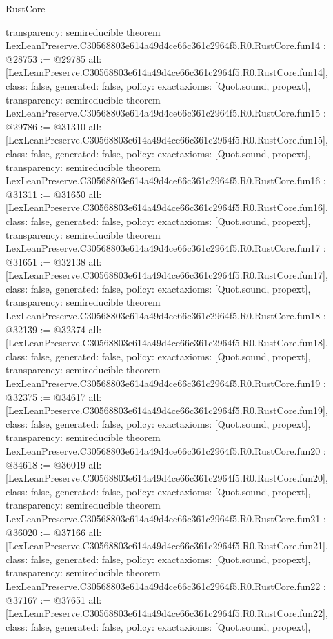 \begin{lexlean}{RustCore}
\begin{coremodule}
{  transparency: semireducible
}
theorem LexLeanPreserve.C30568803e614a49d4ce66c361c2964f5.R0.RustCore.fun14 : @28753 := @29785 {
  all: [LexLeanPreserve.C30568803e614a49d4ce66c361c2964f5.R0.RustCore.fun14],
  class: false,
  generated: false,
  policy: exact{axioms: [Quot.sound, propext]},
  transparency: semireducible
}
theorem LexLeanPreserve.C30568803e614a49d4ce66c361c2964f5.R0.RustCore.fun15 : @29786 := @31310 {
  all: [LexLeanPreserve.C30568803e614a49d4ce66c361c2964f5.R0.RustCore.fun15],
  class: false,
  generated: false,
  policy: exact{axioms: [Quot.sound, propext]},
  transparency: semireducible
}
theorem LexLeanPreserve.C30568803e614a49d4ce66c361c2964f5.R0.RustCore.fun16 : @31311 := @31650 {
  all: [LexLeanPreserve.C30568803e614a49d4ce66c361c2964f5.R0.RustCore.fun16],
  class: false,
  generated: false,
  policy: exact{axioms: [Quot.sound, propext]},
  transparency: semireducible
}
theorem LexLeanPreserve.C30568803e614a49d4ce66c361c2964f5.R0.RustCore.fun17 : @31651 := @32138 {
  all: [LexLeanPreserve.C30568803e614a49d4ce66c361c2964f5.R0.RustCore.fun17],
  class: false,
  generated: false,
  policy: exact{axioms: [Quot.sound, propext]},
  transparency: semireducible
}
theorem LexLeanPreserve.C30568803e614a49d4ce66c361c2964f5.R0.RustCore.fun18 : @32139 := @32374 {
  all: [LexLeanPreserve.C30568803e614a49d4ce66c361c2964f5.R0.RustCore.fun18],
  class: false,
  generated: false,
  policy: exact{axioms: [Quot.sound, propext]},
  transparency: semireducible
}
theorem LexLeanPreserve.C30568803e614a49d4ce66c361c2964f5.R0.RustCore.fun19 : @32375 := @34617 {
  all: [LexLeanPreserve.C30568803e614a49d4ce66c361c2964f5.R0.RustCore.fun19],
  class: false,
  generated: false,
  policy: exact{axioms: [Quot.sound, propext]},
  transparency: semireducible
}
theorem LexLeanPreserve.C30568803e614a49d4ce66c361c2964f5.R0.RustCore.fun20 : @34618 := @36019 {
  all: [LexLeanPreserve.C30568803e614a49d4ce66c361c2964f5.R0.RustCore.fun20],
  class: false,
  generated: false,
  policy: exact{axioms: [Quot.sound, propext]},
  transparency: semireducible
}
theorem LexLeanPreserve.C30568803e614a49d4ce66c361c2964f5.R0.RustCore.fun21 : @36020 := @37166 {
  all: [LexLeanPreserve.C30568803e614a49d4ce66c361c2964f5.R0.RustCore.fun21],
  class: false,
  generated: false,
  policy: exact{axioms: [Quot.sound, propext]},
  transparency: semireducible
}
theorem LexLeanPreserve.C30568803e614a49d4ce66c361c2964f5.R0.RustCore.fun22 : @37167 := @37651 {
  all: [LexLeanPreserve.C30568803e614a49d4ce66c361c2964f5.R0.RustCore.fun22],
  class: false,
  generated: false,
  policy: exact{axioms: [Quot.sound, propext]},
}
\end{coremodule}
\end{lexlean}

